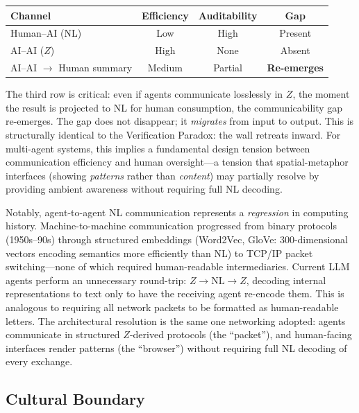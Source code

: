 \documentclass{article}
\theoremstyle{definition}
\begin{document}
\begin{center}
\footnotesize
\begin{tabular}{@{}lccc@{}}
\toprule
\textbf{Channel} & \textbf{Efficiency} & \textbf{Auditability} & \textbf{Gap} \\
\midrule
Human--AI (NL) & Low & High & Present \\
AI--AI ($Z$) & High & None & Absent \\
AI--AI $\to$ Human summary & Medium & Partial & \textbf{Re-emerges} \\
\bottomrule
\end{tabular}
\end{center}

The third row is critical: even if agents communicate losslessly in $Z$, the moment the result is projected to NL for human consumption, the communicability gap re-emerges. The gap does not disappear; it \emph{migrates} from input to output. This is structurally identical to the Verification Paradox: the wall retreats inward. For multi-agent systems, this implies a fundamental design tension between communication efficiency and human oversight---a tension that spatial-metaphor interfaces (showing \emph{patterns} rather than \emph{content}) may partially resolve by providing ambient awareness without requiring full NL decoding.

Notably, agent-to-agent NL communication represents a \emph{regression} in computing history. Machine-to-machine communication progressed from binary protocols (1950s--90s) through structured embeddings (Word2Vec, GloVe: 300-dimensional vectors encoding semantics more efficiently than NL) to TCP/IP packet switching---none of which required human-readable intermediaries. Current LLM agents perform an unnecessary round-trip: $Z \to \text{NL} \to Z$, decoding internal representations to text only to have the receiving agent re-encode them. This is analogous to requiring all network packets to be formatted as human-readable letters. The architectural resolution is the same one networking adopted: agents communicate in structured $Z$-derived protocols (the ``packet''), and human-facing interfaces render patterns (the ``browser'') without requiring full NL decoding of every exchange.

\subsection{Cultural Boundary}
\end{document}
